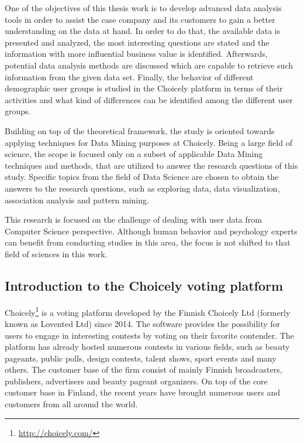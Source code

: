     One of the objectives of this thesis work is to develop advanced data analysis tools in order to assist the case company and its customers to gain a better understanding on the data at hand. In order to do that, the available data is presented and analyzed, the most interesting questions are stated and the information with more influential business value is identified. Afterwards, potential data analysis methods are discussed which are capable to retrieve such information from the given data set. Finally, the behavior of different demographic user groups is studied in the Choicely platform in terms of their activities and what kind of differences can be identified among the different user groups.

    Building on top of the theoretical framework, the study is oriented towards applying techniques for Data Mining purposes at Choicely. Being a large field of science, the scope is focused only on a subset of applicable Data Mining techniques and methods, that are utilized to answer the research questions of this study. Specific topics from the field of Data Science are chosen to obtain the answers to the research questions, such as exploring data, data visualization, association analysis and pattern mining.  

    This research is focused on the challenge of dealing with user data from Computer Science perspective. Although human behavior and psychology experts can benefit from conducting studies in this area, the focus is not shifted to that field of sciences in this work. 

\subsection{Introduction to the Choicely voting platform}
\label{section::introduction-to-the-choicely-voting-platform}
    Choicely\footnote{\url{http://choicely.com/}} is a voting platform developed by the Finnish Choicely Ltd (formerly known as Lovented Ltd) since 2014. The software provides the possibility for users to engage in interesting contests by voting on their favorite contender. The platform has already hosted numerous contests in various fields, such as beauty pageants, public polls, design contests, talent shows, sport events and many others. The customer base of the firm consist of mainly Finnish broadcasters, publishers, advertisers and beauty pageant organizers. On top of the core customer base in Finland, the recent years have brought numerous users and customers from all around the world. 
    
